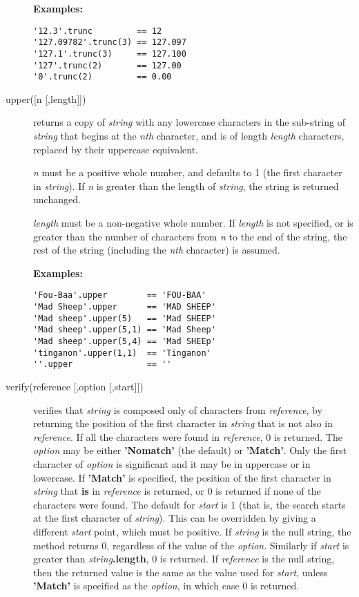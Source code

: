 \begin{description}
\textbf{Examples:}
\begin{lstlisting}
'12.3'.trunc         == 12
'127.09782'.trunc(3) == 127.097
'127.1'.trunc(3)     == 127.100
'127'.trunc(2)       == 127.00
'0'.trunc(2)         == 0.00
\end{lstlisting}

\item[upper([n [,length{]]})]\label{refupper}
returns a copy of \emph{string} with any lowercase characters in
the sub-string of \emph{string} that begins at the \emph{n}\emph{th}
character, and is of length \emph{length} characters, replaced by
their uppercase equivalent.
 
\emph{n} must be a positive whole number, and defaults to 1 (the
first character in \emph{string}).  If \emph{n} is greater than
the length of \emph{string}, the string is returned unchanged.
 
\emph{length} must be a non-negative whole number.
If \emph{length} is not specified, or is greater than the number of
characters from \emph{n} to the end of the string, the rest of the
string (including the \emph{n}\emph{th} character) is assumed.
 
\textbf{Examples:}
\begin{lstlisting}
'Fou-Baa'.upper        == 'FOU-BAA'
'Mad Sheep'.upper      == 'MAD SHEEP'
'Mad sheep'.upper(5)   == 'Mad SHEEP'
'Mad sheep'.upper(5,1) == 'Mad Sheep'
'Mad sheep'.upper(5,4) == 'Mad SHEEp'
'tinganon'.upper(1,1)  == 'Tinganon'
''.upper               == ''
\end{lstlisting}

\item[verify(reference [,option [,start{]]})]\label{refverify}
verifies that \emph{string} is composed only of characters
from \emph{reference}, by returning the position of the first
character in \emph{string} that is not also in
\emph{reference}.  If all the characters were found in
\emph{reference}, 0 is returned.
 The \emph{option} may be either \textbf{'Nomatch'} (the
default) or \textbf{'Match'}.  Only the first character of
\emph{option} is significant and it may be in uppercase or in
lowercase.
If \textbf{'Match'} is specified, the position of the first character
in \emph{string} that \textbf{is} in \emph{reference} is
returned, or 0 is returned if none of the characters were found.
 The default for \emph{start} is 1 (that is, the search starts at
the first character of \emph{string}).
This can be overridden by giving a different \emph{start} point,
which must be positive.
 If \emph{string} is the null string, the method returns 0,
regardless of the value of the \emph{option}.
Similarly if \emph{start} is greater than
\emph{string}\textbf{.length}, 0 is returned.
 If \emph{reference} is the null string, then the returned value
is the same as the value used for \emph{start},
unless \textbf{'Match'} is specified as the \emph{option}, in
which case 0 is returned.
 

\end{description}
